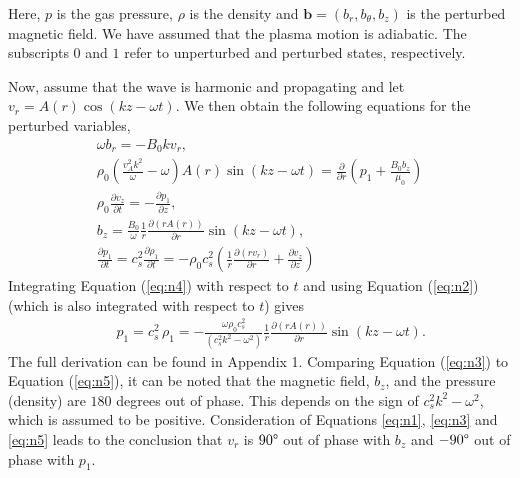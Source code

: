     Here, $p$ is the gas pressure, $\rho$ is the density and $\textbf{b} = (b_r,b_{\theta},b_z)$ is the perturbed magnetic field.
    We have assumed that the plasma motion is adiabatic.
    The subscripts $0$ and $1$ refer to unperturbed and perturbed states, respectively.
    
    Now, assume that the wave is harmonic and propagating and let $v_r=A(r)\cos(kz-\omega t)$.
    We then obtain the following equations for the perturbed variables,	
    \begin{align}
        &&\omega b_r=-B_0kv_r,\label{eq:n0}\\
        &&\rho_0\left(\frac{v_A^2k^2}{\omega}-\omega\right)A(r)\sin(kz-\omega t)=\frac{\partial}{\partial r}\left(p_1+\frac{B_0b_z}{\mu_0}\right)
        &&\label{eq:n1}\\
        &&\rho_0\frac{\partial v_z}{\partial t}=-\frac{\partial p_1}{\partial z},
        \label{eq:n2}\\
        && b_z=\frac{B_0}{\omega}\frac{1}{r}\frac{\partial (rA(r))}{\partial r}\sin(kz-\omega t),
        \label{eq:n3}\\
        &&\frac{\partial p_1}{\partial t}=c_s^2\frac{\partial\rho_1}{\partial t}=-\rho_0 c_s^2\left(\frac{1}{r}\frac{\partial(rv_r)}{\partial r}+\frac{\partial v_z}{\partial z}\right)
        \label{eq:n4}
    \end{align}
    Integrating Equation (\ref{eq:n4}) with respect to $t$ and using Equation (\ref{eq:n2}) (which is also integrated with respect to $t$) gives
    \begin{align}
        &&p_1=c_s^2\,\rho_1=-\frac{\omega\rho_0
            c_s^2}{(c_s^2k^2-\omega^2)}\frac{1}{r}\frac{\partial
            (rA(r))}{\partial r}\sin(kz-\omega t).
        \label{eq:n5}
    \end{align}
    The full derivation can be found in Appendix 1.
    Comparing Equation (\ref{eq:n3}) to Equation (\ref{eq:n5}), it can be noted that the magnetic field, $b_z$, and the pressure (density) are $180$ degrees out of phase.
    This depends on the sign of $c_s^2k^2-\omega^2$, which is assumed to be positive.
    Consideration of Equations \ref{eq:n1}, \ref{eq:n3} and \ref{eq:n5} leads to the conclusion that $v_r$ is $90\degree$ out of phase with $b_z$ and $-90\degree$ out of phase with $p_1$.
    
